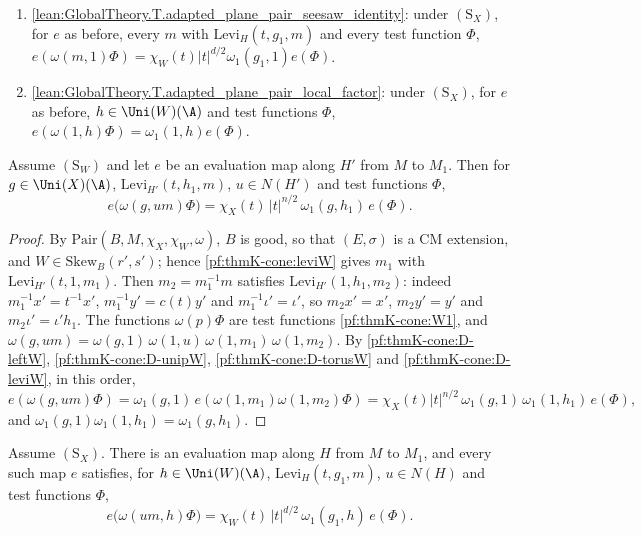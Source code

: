 \begin{enumerate}[resume*=thmKconeD]
  for every evaluation map $e$ along $H$ from $M$ to $M_1$, $u\in N(H)$ and test functions $\Phi$,
  $e(\omega(u,1)\Phi)=e(\Phi)$.
\item\label{pf:thmK-cone:D-leviX} \cref{lean:GlobalTheory.T.adapted_plane_pair_seesaw_identity}: under $(\mathrm{S}_X)$,
  for $e$ as before, every $m$ with $\mathrm{Levi}_H(t,g_1,m)$ and every test function $\Phi$,
  $e(\omega(m,1)\Phi)=\chi_W(t)|t|^{d/2}\omega_1(g_1,1)e(\Phi)$.
\item\label{pf:thmK-cone:D-rightX} \cref{lean:GlobalTheory.T.adapted_plane_pair_local_factor}: under $(\mathrm{S}_X)$, for
  $e$ as before, $h\in\Uni(W)(\A)$ and test functions $\Phi$, $e(\omega(1,h)\Phi)=\omega_1(1,h)e(\Phi)$.
\end{enumerate}

\begin{lemma}\label{pf:thmK-cone:second}
Assume $(\mathrm{S}_W)$ and let $e$ be an evaluation map along $H'$ from $M$ to $M_1$.  Then for $g\in\Uni(X)(\A)$,
$\mathrm{Levi}_{H'}(t,h_1,m)$, $u\in N(H')$ and test functions $\Phi$,
\[
  e\bigl(\omega(g,um)\Phi\bigr)=\chi_X(t)\,|t|^{n/2}\,\omega_1(g,h_1)\,e(\Phi).
\]
\end{lemma}

\begin{proof}
By $\mathrm{Pair}(B,M,\chi_X,\chi_W,\omega)$, $B$ is good, so that $(E,\sigma)$ is a CM extension, and
$W\in\mathrm{Skew}_B(r',s')$; hence \cref{pf:thmK-cone:leviW} gives $m_1$ with $\mathrm{Levi}_{H'}(t,1,m_1)$.  Then $m_2=m_1^{-1}m$ satisfies $\mathrm{Levi}_{H'}(1,h_1,m_2)$: indeed
$m_1^{-1}x'=t^{-1}x'$, $m_1^{-1}y'=c(t)y'$ and $m_1^{-1}\iota'=\iota'$, so $m_2x'=x'$, $m_2y'=y'$ and
$m_2\iota'=\iota'h_1$.  The functions $\omega(p)\Phi$ are test functions \ref{pf:thmK-cone:W1}, and
$\omega(g,um)=\omega(g,1)\,\omega(1,u)\,\omega(1,m_1)\,\omega(1,m_2)$.  By \ref{pf:thmK-cone:D-leftW},
\ref{pf:thmK-cone:D-unipW}, \ref{pf:thmK-cone:D-torusW} and \ref{pf:thmK-cone:D-leviW}, in this order,
\[
  e(\omega(g,um)\Phi)=\omega_1(g,1)\,e(\omega(1,m_1)\omega(1,m_2)\Phi)
  =\chi_X(t)|t|^{n/2}\,\omega_1(g,1)\,\omega_1(1,h_1)\,e(\Phi),
\]
and $\omega_1(g,1)\omega_1(1,h_1)=\omega_1(g,h_1)$.
\end{proof}

\begin{lemma}\label{pf:thmK-cone:first}
Assume $(\mathrm{S}_X)$.  There is an evaluation map along $H$ from $M$ to $M_1$, and every such map $e$ satisfies, for
$h\in\Uni(W)(\A)$, $\mathrm{Levi}_H(t,g_1,m)$, $u\in N(H)$ and test functions $\Phi$,
\[
  e\bigl(\omega(um,h)\Phi\bigr)=\chi_W(t)\,|t|^{d/2}\,\omega_1(g_1,h)\,e(\Phi).
\]
\end{lemma}

